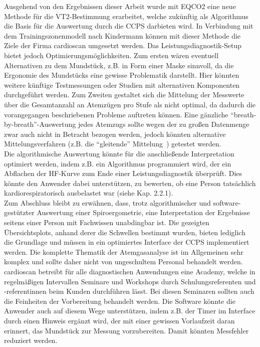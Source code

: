 Ausgehend von den Ergebnissen dieser Arbeit wurde mit \acs{EQCO2} eine neue Methode für die VT2-Bestimmung erarbeitet, welche zukünftig als Algorithmus die Basis für die Auswertung durch die \acs{CCPS} darbieten wird. In Verbindung mit dem Trainingszonenmodell nach Kindermann können mit dieser Methode die Ziele der Firma cardioscan umgesetzt werden. Das Leistungsdiagnostik-Setup bietet jedoch Optimierungsmöglichkeiten. Zum ersten wären eventuell Alternativen zu dem Mundstück, z.B. in Form einer Maske sinnvoll, da die Ergonomie des Mundstücks eine gewisse Problematik darstellt. Hier könnten weitere künftige Testmessungen oder Studien mit alternativen Komponenten durchgeführt werden. Zum Zweiten gestaltet sich die Mittelung der Messwerte über die Gesamtanzahl an Atemzügen pro Stufe als nicht optimal, da dadurch die vorangegangen beschriebenen Probleme auftreten können. Eine gänzliche "`breath-by-breath"'-Auswertung jedes Atemzugs sollte wegen der zu großen Datenmenge zwar auch nicht in Betracht bezogen werden, jedoch könnten alternative Mittelungsverfahren (z.B. die "`gleitende"' Mittelung~\cite{Kroidl.2015}) getestet werden.\\
Die algorithmische Auswertung könnte für die anschließende Interpretation optimiert werden, indem z.B. ein Algorithmus programmiert wird, der ein Abflachen der \acs{HF}-Kurve zum Ende einer Leistungsdiagnostik überprüft. Dies könnte den Anwender dabei unterstützen, zu bewerten, ob eine Person tatsächlich kardiorespiratorisch ausbelastet war (siehe Kap. 2.2.1).\\
Zum Abschluss bleibt zu erwähnen, dass, trotz algorithmischer und software-gestützter Auswertung einer Spiroergometrie, eine Interpretation der Ergebnisse seitens einer Person mit Fachwissen unabdingbar ist. Die gezeigten Übersichtsplots, anhand derer die Schwellen bestimmt wurden, bieten lediglich die Grundlage und müssen in ein optimiertes Interface der \acs{CCPS} implementiert werden. Die komplette Thematik der Atemgasanalyse ist im Allgemeinen sehr komplex und sollte daher nicht von ungeschultem Personal behandelt werden. cardioscan betreibt für alle diagnostischen Anwendungen eine Academy, welche in regelmäßigen Intervallen Seminare und Workshops durch Schulungsreferenten und -referentinnen beim Kunden durchführen lässt. Bei diesen Seminaren sollten auch die Feinheiten der Vorbereitung behandelt werden. Die Software könnte die Anwender auch auf diesem Wege unterstützen, indem z.B. der Timer im Interface durch einen Hinweis ergänzt wird, der mit einer gewissen Vorlaufzeit daran erinnert, das Mundstück zur Messung vorzubereiten. Damit könnten Messfehler reduziert werden.


\cleardoublepage
\nocite{*}


%
\printbibliography